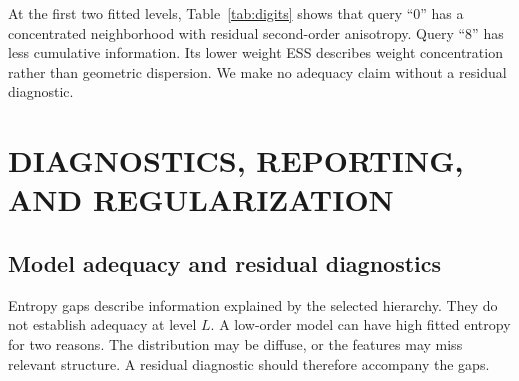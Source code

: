 \documentclass[twoside]{article}
\theoremstyle{definition}
\theoremstyle{remark}
\begin{document}
\begin{table}[ht]
\centering
\caption{Query-weighted digit embeddings after projection to $S^2$. Class mass lists the three largest label masses induced by the query weights.}
\label{tab:digits}
\scriptsize
{}
\end{table}

At the first two fitted levels, Table~\ref{tab:digits} shows that query ``0'' has a concentrated neighborhood with residual second-order anisotropy. Query ``8'' has less cumulative information. Its lower weight ESS describes weight concentration rather than geometric dispersion. We make no adequacy claim without a residual diagnostic.







\section{DIAGNOSTICS, REPORTING, AND REGULARIZATION}
\label{app:diagnostics_reporting}
\label{app:adequacy_regularization}

\subsection{Model adequacy and residual diagnostics}

Entropy gaps describe information explained by the selected hierarchy. They do not establish adequacy at level $L$. A low-order model can have high fitted entropy for two reasons. The distribution may be diffuse, or the features may miss relevant structure. A residual diagnostic should therefore accompany the gaps.
\end{document}
